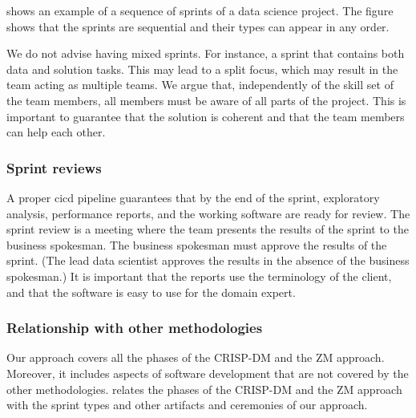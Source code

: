  shows an example of a sequence of sprints of a data science project.
The figure shows that the sprints are sequential and their types can appear in
any order.

We do not advise having mixed sprints.  For instance, a sprint that contains both data
and solution tasks.  This may lead to a split focus, which may result in the team acting
as multiple teams.  We argue that, independently of the skill set of the team members,
all members must be aware of all parts of the project.  This is important to guarantee
that the solution is coherent and that the team members can help each other.

\subsubsection{Sprint reviews}

A proper \gls{cicd} pipeline guarantees that by the end of the sprint,
exploratory analysis, performance reports, and the working software are ready for review.
The sprint review is a meeting where the team presents the results of the sprint to the
business spokesman.  The business spokesman must approve the results of the sprint.
(The lead data scientist approves the results in the absence of the business spokesman.)
It is important that the reports use the terminology of the client, and that the
software is easy to use for the domain expert.


\subsubsection{Relationship with other methodologies}

Our approach covers all the phases of the CRISP-DM and the ZM approach.  Moreover, it
includes aspects of software development that are not covered by the other
methodologies.  relates the phases of the CRISP-DM and the ZM approach
with the sprint types and other artifacts and ceremonies of our approach.

